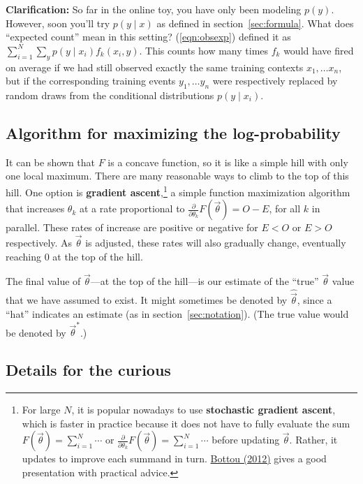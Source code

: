 \documentclass[11pt]{article}
\newcommand{\vtheta}{\vec{\theta}}
\newcommand{\diffk}{\frac{\partial}{\partial \theta_k}}
\begin{document}
{\bf Clarification:} So far in the online toy, you have only been
modeling $p(y)$.  However, soon you'll try $p(y\mid x)$ as
defined in section~\ref{sec:formula}.  What does ``expected count'' mean in this
setting?  (\ref{eqn:obsexp}) defined it as $\sum_{i=1}^N \sum_y
p(y\mid x_i) f_k(x_i,y)$.  This counts how many times $f_k$ would
have fired on average if we had still observed exactly the same
training contexts $x_1,\ldots x_n$, but if the corresponding training events
$y_1,\ldots y_n$ were respectively replaced by random draws from the
conditional distributions $p(y \mid x_i)$.

\subsection{Algorithm for maximizing the log-probability}

It can be shown that $F$ is a concave function, so it is like a simple hill with only one local maximum.  There are many reasonable ways to climb to the top of this hill.  One option is {\bf gradient ascent},\footnote{\label{fn:sgd}For large $N$, it is popular nowadays to use
  {\bf stochastic gradient ascent}, which is faster in practice because it does not have to fully evaluate the sum $F(\vtheta) = \sum_{i=1}^N \cdots$ or $\diffk F(\vtheta) = \sum_{i=1}^N \cdots$ before updating $\vtheta$.  Rather, it updates to improve each summand in turn.  \href{http://research.microsoft.com/pubs/192769/tricks-2012.pdf}{Bottou (2012)} gives a good presentation with practical advice.} a
simple function maximization algorithm that increases $\theta_k$ at a
rate proportional to $\diffk F(\vtheta)=O-E$, for all $k$ in parallel.
These rates of increase are positive or negative for $E < O$ or $E >
O$ respectively.  As $\vtheta$ is adjusted, these rates will also
gradually change, eventually reaching 0 at the top of the hill.

The final value of $\vtheta$---at the top of the hill---is our estimate of the ``true'' 
$\vtheta$ value that we have assumed to exist.  It might sometimes be
denoted by $\widehat{\vtheta}$, since a ``hat'' indicates an estimate
(as in section~\ref{sec:notation}).  (The true value would be denoted
by $\vtheta^*$.)

\subsection{Details for the curious}
\end{document}
